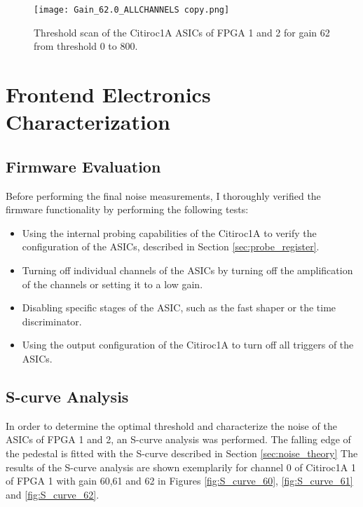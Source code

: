     \begin{figure}[H]
        \centering
        \texttt{[image: Gain\_62.0\_ALLCHANNELS copy.png]}
        \caption{Threshold scan of the Citiroc1A ASICs of FPGA 1 and 2 for gain 62 from threshold 0 to 800.}
        \label{fig:threshold_scan_62}
    \end{figure}
    \section{Frontend Electronics Characterization}
    \subsection{Firmware Evaluation}
    Before performing the final noise measurements, I thoroughly verified the firmware functionality by performing the following tests:
    \begin{itemize}
        \item Using the internal probing capabilities of the Citiroc1A to verify the configuration of the ASICs, described in Section \ref{sec:probe_register}.
        \item Turning off individual channels of the ASICs by turning off the amplification of the channels or setting it to a low gain.
        \item Disabling specific stages of the ASIC, such as the fast shaper or the time discriminator.
        \item Using the output configuration of the Citiroc1A to turn off all triggers of the ASICs.
    \end{itemize}
    \subsection{S-curve Analysis}
    In order to determine the optimal threshold and characterize the noise of the ASICs of FPGA 1 and 2, an S-curve analysis was performed.
    \newline
    The falling edge of the pedestal is fitted with the S-curve described in Section \ref{sec:noise_theory}
    \newline
    The results of the S-curve analysis are shown exemplarily for channel 0 of Citiroc1A 1 of FPGA 1 with gain 60,61 and 62 in Figures \ref{fig:S_curve_60}, \ref{fig:S_curve_61} and \ref{fig:S_curve_62}.
    
